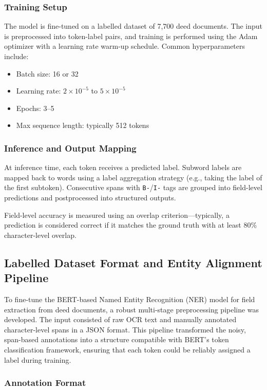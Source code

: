 \documentclass{article}
\begin{document}
\subsubsection{Training Setup}

The model is fine-tuned on a labelled dataset of 7,700 deed documents. The input is preprocessed into token-label pairs, and training is performed using the Adam optimizer with a learning rate warm-up schedule. Common hyperparameters include:
\begin{itemize}
    \item Batch size: 16 or 32
    \item Learning rate: $2 \times 10^{-5}$ to $5 \times 10^{-5}$
    \item Epochs: 3–5
    \item Max sequence length: typically 512 tokens
\end{itemize}

\subsubsection{Inference and Output Mapping}

At inference time, each token receives a predicted label. Subword labels are mapped back to words using a label aggregation strategy (e.g., taking the label of the first subtoken). Consecutive spans with \texttt{B-}/\texttt{I-} tags are grouped into field-level predictions and postprocessed into structured outputs.

Field-level accuracy is measured using an overlap criterion—typically, a prediction is considered correct if it matches the ground truth with at least 80\% character-level overlap.

\subsection{Labelled Dataset Format and Entity Alignment Pipeline}

To fine-tune the BERT-based Named Entity Recognition (NER) model for field extraction from deed documents, a robust multi-stage preprocessing pipeline was developed. The input consisted of raw OCR text and manually annotated character-level spans in a JSON format. This pipeline transformed the noisy, span-based annotations into a structure compatible with BERT’s token classification framework, ensuring that each token could be reliably assigned a label during training.

\subsubsection{Annotation Format}
\end{document}
